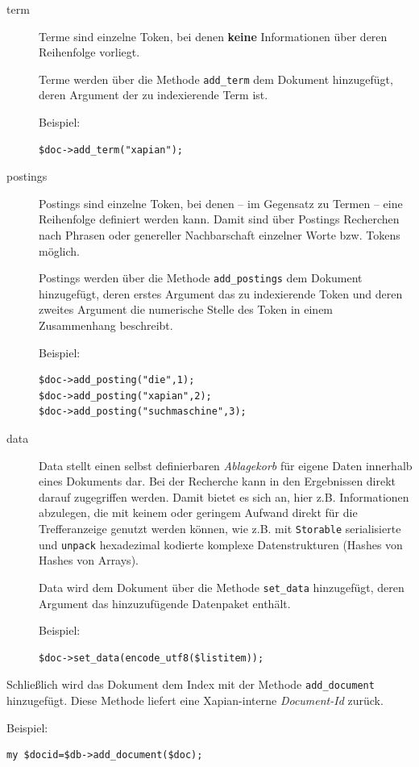\documentclass[11pt, twoside, a4paper, BCOR8mm, DIV12, bibtotoc,idxtotoc]{scrbook}
\begin{document}
\begin{description}
\item[term] Terme sind einzelne Token, bei denen \textbf{keine}
  Informationen über deren Reihenfolge vorliegt.

  Terme werden über die Methode \texttt{add\_term} dem Dokument
  hinzugefügt, deren Argument der zu indexierende Term ist.

  Beispiel:
\begin{verbatim}
$doc->add_term("xapian");
\end{verbatim}
\item[postings] Postings sind einzelne Token, bei denen -- im
  Gegensatz zu Termen -- eine Reihenfolge definiert werden kann. Damit
  sind über Postings Recherchen nach Phrasen oder genereller
  Nachbarschaft einzelner Worte bzw. Tokens möglich.

  Postings werden über die Methode \texttt{add\_postings} dem Dokument
  hinzugefügt, deren erstes Argument das zu indexierende Token und
  deren zweites Argument die numerische Stelle des Token in einem
  Zusammenhang beschreibt.

  Beispiel:
\begin{verbatim}
$doc->add_posting("die",1);
$doc->add_posting("xapian",2);
$doc->add_posting("suchmaschine",3);
\end{verbatim}
\item[data] Data stellt einen selbst definierbaren \emph{Ablagekorb}
  für eigene Daten innerhalb eines Dokuments dar. Bei der Recherche kann
  in den Ergebnissen direkt darauf zugegriffen werden. Damit bietet es
  sich an, hier z.B. Informationen abzulegen, die mit keinem oder
  geringem Aufwand direkt für die Trefferanzeige genutzt werden
  können, wie z.B. mit \texttt{Storable} serialisierte und
  \texttt{unpack} hexadezimal kodierte komplexe Datenstrukturen
  (Hashes von Hashes von Arrays).

  Data wird dem Dokument über die Methode \texttt{set\_data}
  hinzugefügt, deren Argument das hinzuzufügende Datenpaket enthält.

  Beispiel:
\begin{verbatim}
$doc->set_data(encode_utf8($listitem));
\end{verbatim}
\end{description}
Schließlich wird das Dokument dem Index mit der Methode
\texttt{add\_document} hinzugefügt. Diese Methode liefert eine
Xapian-interne \emph{Document-Id} zurück.

Beispiel:
\begin{verbatim}
my $docid=$db->add_document($doc);
\end{verbatim}
\end{document}
